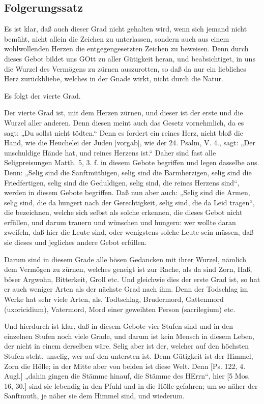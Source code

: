 \subsection{Folgerungssatz}

Es ist klar, daß auch dieser Grad nicht gehalten wird, wenn sich jemand nicht bemüht, nicht allein die Zeichen zu unterlassen, sondern auch aus einem wohlwollenden Herzen die entgegengesetzten Zeichen zu beweisen. Denn durch dieses Gebot bildet uns GOtt zu aller Gütigkeit heran, und beabsichtiget, in uns die Wurzel des Vermögens zu zürnen auszurotten, so daß da nur ein liebliches Herz zurückbliebe, welches in der Gnade wirkt, nicht durch die Natur.

Es folgt der vierte Grad.

Der vierte Grad ist, mit dem Herzen zürnen, und dieser ist der erste und die Wurzel aller anderen. Denn diesen meint auch das Gesetz vornehmlich, da es sagt: „Du sollst nicht tödten.“ Denn es fordert ein reines Herz, nicht bloß die Hand, wie die Heuchelei der Juden [vorgab], wie der 24. Psalm, V. 4., sagt: „Der unschuldige Hände hat, und reines Herzens ist.“ Daher sind fast alle Seligpreisungen Matth. 5, 3. f. in diesem Gebote begriffen und legen dasselbe aus. Denn: „Selig sind die Sanftmüthigen, selig sind die Barmherzigen, selig sind die Friedfertigen, selig sind die Geduldigen, selig sind, die reines Herzens sind“, werden in diesem Gebote begriffen. Daß nun aber auch: „Selig sind die Armen, selig sind, die da hungert nach der Gerechtigkeit, selig sind, die da Leid tragen“, die bezeichnen, welche sich selbst als solche erkennen, die dieses Gebot nicht erfüllen, und darum trauern und wünschen und hungern: wer wollte daran zweifeln, daß hier die Leute sind, oder wenigstens solche Leute sein müssen, daß sie dieses und jegliches andere Gebot erfüllen.

Darum sind in diesem Grade alle bösen Gedancken mit ihrer Wurzel, nämlich dem Vermögen zu zürnen, welches geneigt ist zur Rache, als da sind Zorn, Haß, böser Argwohn, Bitterkeit, Groll etc. Und gleichwie dies der erste Grad ist, so hat er auch weniger Arten als der nächste Grad nach ihm. Denn der Todschlag im Werke hat sehr viele Arten, als, Todtschlag, Brudermord, Gattenmord (uxoricidium), Vatermord, Mord einer geweihten Person (sacrilegium) etc.

Und hierdurch ist klar, daß in diesem Gebote vier Stufen sind und in den einzelnen Stufen noch viele Grade, und darum ist kein Mensch in
diesem Leben, der nicht in einem derselben wäre. Selig aber ist der, welcher auf den höchsten Stufen steht, unselig, wer auf den untersten ist. Denn Gütigkeit ist der Himmel, Zorn die Hölle; in der Mitte aber von beiden ist diese Welt. Denn [Ps. 122, 4. Augl.] „dahin gingen die Stämme hinauf, die Stämme des HErrn“, hier [5 Mos. 16, 30.] sind sie lebendig in den Pfuhl und in die Hölle gefahren; um so näher der Sanftmuth, je näher sie dem Himmel sind, und wiederum.

